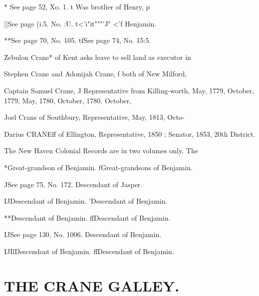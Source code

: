\documentclass[oneside]{book}
\begin{document}
* See page 52, Xo. 1. t Was brotlier of Henry, p 


||See page (i.5. No. :U. t<'i"it"""'J" <'f Henjamin. 

**See page 70, No. 105. tfSee page 74, No. 15:5. 




Zebulon Crane* of Kent asks leave to sell land as executor in 

Stephen Crane and Adonijah Crane, f both of New Milford, 

Captain Samuel Crane, J Representative from Killing-worth, 
May, 1779, October, 1779, May, 1780, October, 1780, October, 

Joel Crane of Southbury, Representative, May, 1813, Octo- 




Darius CRANEff of Ellington, Representative, 1850 ; Senator, 
1853, 20th District. 


The New Haven Colonial Records are in two volumes only. The 



*Great-grandson of Benjamin. fGreat-grandsons of Benjamin. 

JSee page 75, No. 172. Descendant of Jasper. 

IJDescendant of Benjamin. 'Descendant of Benjamin. 

**Descendant of Benjamin. ffDescendant of Benjamin. 

IJSee page 130, No. 1006. Descendant of Benjamin. 

IJIlDescendant of Benjamin. ffDescendant of Benjamin. 



\chapter{THE CRANE GALLEY.}
\end{document}
